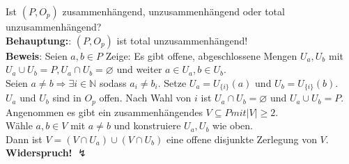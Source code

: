 \begin{problem*}[2b]
  Ist \( (P, O_p) \) zusammenhängend, unzusammenhängend oder total unzusammenhängend? \\
  \textbf{Behauptung:}: \( (P, O_p) \) ist total unzusammenhängend! \\
  \textbf{Beweis}: Seien \( a,b \in P \) Zeige: Es gibt offene, abgeschlossene Mengen \( U_a, U_b \) mit \( U_a \cup U_b = P, U_a \cap U_b = \varnothing \) und weiter \( a \in U_a , b \in U_b \). \\
  Seien \( a \neq b \Rightarrow \exists i \in \mathbb{N} \) sodass \( a_i \neq b_i \). Setze \( U_a = U_{\{ i \}}(a) \) und \( U_b = U_{\{ i \}}(b) \). \\
  \( U_a \) und \( U_b \) sind in \( O_p \) offen. Nach Wahl von \( i \) ist \( U_a \cap U_b = \varnothing \) und \( U_a \cup U_b = P \). Angenommen es gibt ein zusammenhängendes \( V \subseteq P mit \vert V \vert \geq 2 \). \\
  Wähle \( a, b \in V \) mit \( a \neq b \) und konstruiere \( U_a, U_b \) wie oben. \\
  Dann ist \( V = (V \cap U_a) \cup (V \cap U_b) \) eine offene disjunkte Zerlegung von \( V \). \\
  \textbf{Widerspruch!} \( \lightning \)
  
\end{problem*}

